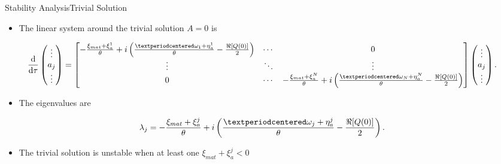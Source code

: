 \documentclass[dvipsnames, aspectratio = 169]{beamer}
\newcommand*\df{\mathop{}\!\mathrm{d}}
\begin{document}
\begin{frame}{Stability Analysis}{Trivial Solution}
	\begin{itemize}
		\item The linear system around the trivial solution $ A = 0 $ is
	\end{itemize}

	\begin{equation}\label{eq:trivial_solution_equilibria}
		\frac{\df}{\df \tau}\begin{pmatrix}
			\vdots \\
			a_j    \\
			\vdots
		\end{pmatrix}
		=  \begin{bmatrix}
			-\frac{\xi_{mat} + \xi_a^1}{\theta} + i\left(\frac{·\omega_1 + \eta_a^1}{\theta}-\frac{\real{[Q(0)]}}{2}\right) & \cdots & 0                                                                                                               \\
			\vdots                                                                                                          & \ddots & \vdots                                                                                                          \\
			0                                                                                                               & \cdots & -\frac{\xi_{mat} + \xi_a^N}{\theta} + i\left(\frac{·\omega_N + \eta_a^N}{\theta}-\frac{\real{[Q(0)]}}{2}\right)
		\end{bmatrix}
		\begin{pmatrix}
			\vdots \\
			a_j    \\
			\vdots
		\end{pmatrix}.
	\end{equation}
	\begin{itemize}
		\item The eigenvalues are
	\end{itemize}
	\begin{equation}\label{eq:eigenvalues_of_trivial_solution}
		\lambda_j = -\frac{\xi_{mat} + \xi_a^j}{\theta} + i\left(\frac{·\omega_j + \eta_a^j}{\theta}-\frac{\real{[Q(0)]}}{2}\right).
	\end{equation}
	\begin{itemize}
		\item The trivial solution is unstable when at least one $ \xi_{mat} + \xi_a^j  < 0 $
	\end{itemize}
\end{frame}
\end{document}
